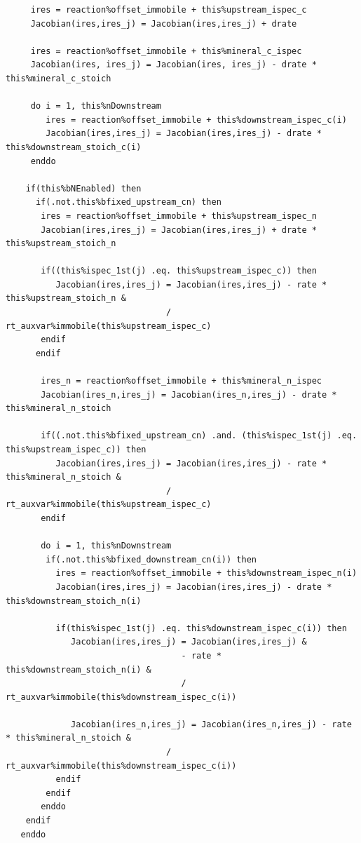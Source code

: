\documentclass[12pt, a4paper]{article}
\begin{document}
\begin{verbatim}
     ires = reaction%offset_immobile + this%upstream_ispec_c      
     Jacobian(ires,ires_j) = Jacobian(ires,ires_j) + drate       

     ires = reaction%offset_immobile + this%mineral_c_ispec      
     Jacobian(ires, ires_j) = Jacobian(ires, ires_j) - drate * this%mineral_c_stoich      

     do i = 1, this%nDownstream
        ires = reaction%offset_immobile + this%downstream_ispec_c(i)      
        Jacobian(ires,ires_j) = Jacobian(ires,ires_j) - drate * this%downstream_stoich_c(i)
     enddo 

    if(this%bNEnabled) then
      if(.not.this%bfixed_upstream_cn) then
       ires = reaction%offset_immobile + this%upstream_ispec_n      
       Jacobian(ires,ires_j) = Jacobian(ires,ires_j) + drate * this%upstream_stoich_n      
       
       if((this%ispec_1st(j) .eq. this%upstream_ispec_c)) then
          Jacobian(ires,ires_j) = Jacobian(ires,ires_j) - rate * this%upstream_stoich_n &      
                                / rt_auxvar%immobile(this%upstream_ispec_c)
       endif
      endif  

       ires_n = reaction%offset_immobile + this%mineral_n_ispec      
       Jacobian(ires_n,ires_j) = Jacobian(ires_n,ires_j) - drate * this%mineral_n_stoich      

       if((.not.this%bfixed_upstream_cn) .and. (this%ispec_1st(j) .eq. this%upstream_ispec_c)) then
          Jacobian(ires,ires_j) = Jacobian(ires,ires_j) - rate * this%mineral_n_stoich &      
                                / rt_auxvar%immobile(this%upstream_ispec_c)
       endif
       
       do i = 1, this%nDownstream
        if(.not.this%bfixed_downstream_cn(i)) then
          ires = reaction%offset_immobile + this%downstream_ispec_n(i)      
          Jacobian(ires,ires_j) = Jacobian(ires,ires_j) - drate * this%downstream_stoich_n(i)      

          if(this%ispec_1st(j) .eq. this%downstream_ispec_c(i)) then
             Jacobian(ires,ires_j) = Jacobian(ires,ires_j) &
                                   - rate * this%downstream_stoich_n(i) &      
                                   / rt_auxvar%immobile(this%downstream_ispec_c(i))

             Jacobian(ires_n,ires_j) = Jacobian(ires_n,ires_j) - rate * this%mineral_n_stoich &      
                                / rt_auxvar%immobile(this%downstream_ispec_c(i))
          endif
        endif
       enddo 
    endif
   enddo 


\end{verbatim}
\end{document}

